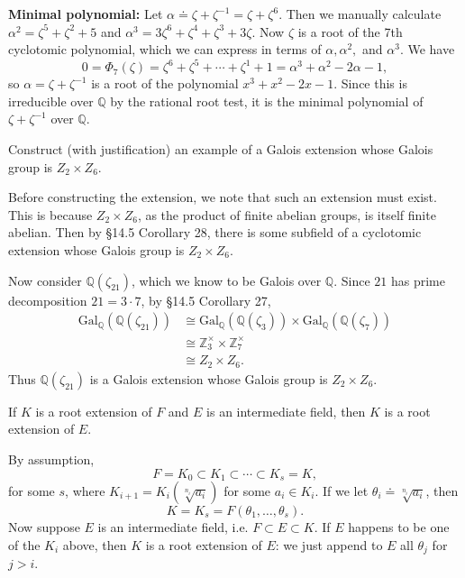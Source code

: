\documentclass[twoside,10pt]{report}
\begin{document}
\begin{center}
\end{center}

\textbf{Minimal polynomial:} Let $\alpha \doteq \zeta+\zeta^{-1}=\zeta+\zeta^{6}$. Then we manually calculate $\alpha^{2}=\zeta^{5}+\zeta^{2}+5$ and $\alpha^{3}=3\zeta^{6}+\zeta^{4}+\zeta^{3}+3\zeta$. Now $\zeta$ is a root of the 7th cyclotomic polynomial, which we can express in terms of $\alpha,\alpha^{2},$ and $\alpha^3$. We have
\[
	0=\Phi_{7}(\zeta)=\zeta^{6}+\zeta^{5}+\cdots+\zeta^{1}+1 = \alpha^{3}+\alpha^{2}-2\alpha-1,
\] so $\alpha = \zeta+\zeta^{-1}$ is a root of the polynomial $x^{3}+x^2-2x-1$. Since this is irreducible over $\mathbb{Q}$ by the rational root test, it is the minimal polynomial of $\zeta+\zeta^{-1}$ over $\mathbb{Q}$.

\newpage
\begin{exer}[]
	Construct (with justification) an example of a Galois extension whose Galois group is $Z_2\times Z_6$.
\end{exer}
Before constructing the extension, we note that such an extension must exist. This is because $Z_{2}\times Z_{6}$, as the product of finite abelian groups, is itself finite abelian. Then by \S 14.5 Corollary 28, there is some subfield of a cyclotomic extension whose Galois group is $Z_{2}\times Z_6$.

Now consider $\mathbb{Q}(\zeta_{21})$, which we know to be Galois over $\mathbb{Q}$. Since $21$ has prime decomposition $21=3 \cdot 7$, by \S 14.5 Corollary 27,
\begin{align*}
	\text{Gal}_{\mathbb{Q}}(\mathbb{Q}(\zeta_{21})) &\cong \text{Gal}_{\mathbb{Q}}(\mathbb{Q}(\zeta_3))\times \text{Gal}_{\mathbb{Q}}(\mathbb{Q}(\zeta_7)) \\
							&\cong \mathbb{Z}_{3}^{\times}\times \mathbb{Z}_{7}^{\times}\\
							&\cong Z_{2}\times Z_{6}.
\end{align*}
Thus $\mathbb{Q}(\zeta_{21})$ is a Galois extension whose Galois group is $Z_2\times Z_6$.

\newpage
\begin{exer}[]
	If $K$ is a root extension of $F$ and $E$ is an intermediate field, then $K$ is a root extension of $E$.
\end{exer}
By assumption,
\[
F = K_0\subset K_1 \subset \cdots \subset K_s=K,
\] for some $s$, where $K_{i+1}=K_i\left( \sqrt[n_i]{a_i}  \right)$ for some $a_i \in K_i$. If we let $\theta_i \doteq \sqrt[n_i]{a_i}$, then
\[
	K = K_s = F(\theta_1, \dots, \theta_s).
\] 
Now suppose $E$ is an intermediate field, i.e. $F \subset E \subset K$. If $E$ happens to be one of the $K_i$ above, then $K$ is a root extension of $E$: we just append to $E$ all $\theta_j$ for $j>i$.
\end{document}
